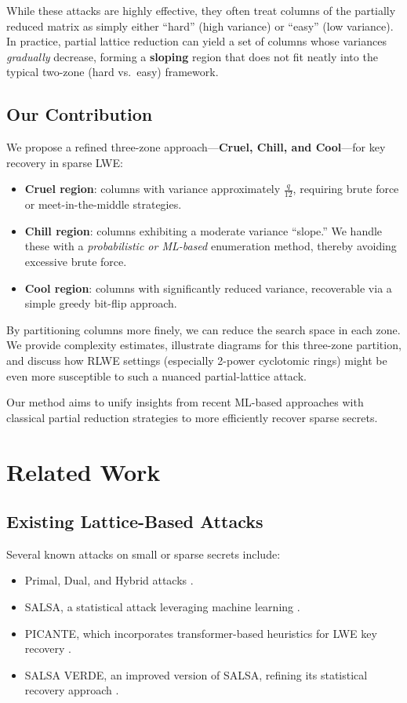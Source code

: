 \documentclass[conference]{IEEEtran}
\begin{document}
  While these attacks are highly effective, they often treat columns of the partially reduced matrix as simply either “hard” (high variance) or “easy” (low variance). In practice, partial lattice reduction can yield a set of columns whose variances \emph{gradually} decrease, forming a \textbf{sloping} region that does not fit neatly into the typical two-zone (hard vs.\ easy) framework.
  
  \subsection{Our Contribution}
  
  We propose a refined three-zone approach—\textbf{Cruel, Chill, and Cool}—for key recovery in sparse LWE:
  
  \begin{itemize}
      \item \textbf{Cruel region}: columns with variance approximately $\frac{q}{12}$, requiring brute force or meet-in-the-middle strategies.
      \item \textbf{Chill region}: columns exhibiting a moderate variance “slope.” We handle these with a \emph{probabilistic or ML-based} enumeration method, thereby avoiding excessive brute force.
      \item \textbf{Cool region}: columns with significantly reduced variance, recoverable via a simple greedy bit-flip approach.
  \end{itemize}
  
  By partitioning columns more finely, we can reduce the search space in each zone. We provide complexity estimates, illustrate diagrams for this three-zone partition, and discuss how RLWE settings (especially 2-power cyclotomic rings) might be even more susceptible to such a nuanced partial-lattice attack. 
  
  Our method aims to unify insights from recent ML-based approaches with classical partial reduction strategies to more efficiently recover sparse secrets.
  
  \section{Related Work}
  
  \subsection{Existing Lattice-Based Attacks}
  Several known attacks on small or sparse secrets include:
  \begin{itemize}
      \item Primal, Dual, and Hybrid attacks \cite{primal-dual, hybrid-mitm}.
      \item SALSA, a statistical attack leveraging machine learning \cite{salsa}.
      \item PICANTE, which incorporates transformer-based heuristics for LWE key recovery \cite{picante}.
      \item SALSA VERDE, an improved version of SALSA, refining its statistical recovery approach \cite{salsa-verde}.
  \end{itemize}
  
\end{document}

